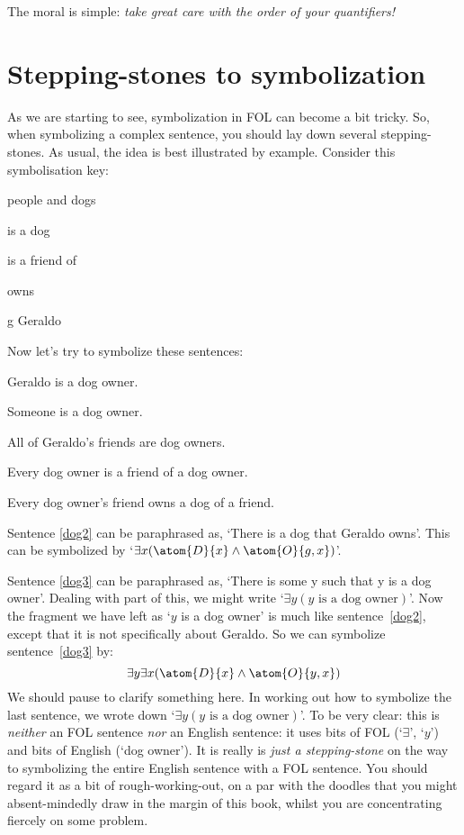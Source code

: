 The moral is simple: \emph{take great care with the order of your quantifiers!}


\section{Stepping-stones to symbolization}
As we are starting to see, symbolization in FOL can become a bit tricky. So, when symbolizing a complex sentence, you should lay down several stepping-stones. As usual, the idea is best illustrated by example. Consider this symbolisation key: 
\begin{ekey}
\item[\text{domain}] people and dogs
\item[\atom{D}{x}]  is a dog
\item[\atom{F}{x,y}]  is a friend of 
\item[\atom{O}{x,y}]  owns 
\item[g] Geraldo
\end{ekey}
Now let's try to symbolize these sentences:
\begin{earg}
\item[\ex{dog2}] Geraldo is a dog owner.
\item[\ex{dog3}] Someone is a dog owner.
\item[\ex{dog4}] All of Geraldo's friends are dog owners.
\item[\ex{dog5}] Every dog owner is a friend of a dog owner.
\item[\ex{dog6}] Every dog owner's friend owns a dog of a friend.
\end{earg}
Sentence \ref{dog2} can be paraphrased as, `There is a dog that Geraldo owns'. This can be symbolized by `$\exists x(\atom{D}{x} \eand \atom{O}{g,x})$'.

Sentence \ref{dog3} can be paraphrased as, `There is some y such that y is a dog owner'. Dealing with part of this, we might write `$\exists y(y\text{ is a dog owner})$'. Now the fragment we have left as `$y$ is a dog owner' is much like sentence~\ref{dog2}, except that it is not specifically about Geraldo. So we can symbolize sentence~\ref{dog3} by:
$$\exists y \exists x(\atom{D}{x} \eand \atom{O}{y,x})$$
We should pause to clarify something here. In working out how to symbolize the last sentence, we wrote down `$\exists y(y\text{ is a dog owner})$'. To be very clear: this is \emph{neither} an FOL sentence \emph{nor} an English sentence: it uses bits of FOL (`$\exists$', `$y$') and bits of English (`dog owner'). It is really is \emph{just a stepping-stone} on the way to symbolizing the entire English sentence with a FOL sentence. You should regard it as a bit of rough-working-out, on a par with the doodles that you might absent-mindedly draw in the margin of this book, whilst you are concentrating fiercely on some problem.  

